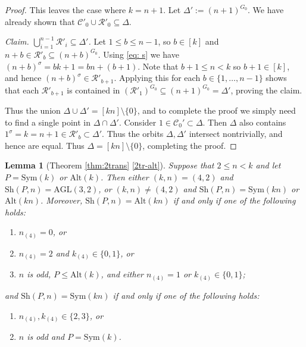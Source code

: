 \documentclass[12pt]{amsart}
\newtheorem{lem}[thm]{Lemma}
\theoremstyle{remark}
\theoremstyle{definition}
\newcounter{claim}[thm]
\newcommand{\sym}{\mathrm{Sym}}
\newcommand{\alt}{\mathrm{Alt}}
\newcommand{\sh}{\mathrm{Sh}}
\newcommand{\AGL}{\mathrm{AGL}}
\begin{document}
\begin{proof}
This leaves the case where $k = n+1$. Let $\Delta':=(n+1)^{G_0}$. We have already shown that $\mathcal{C}'_0 \cup \mathcal{R}'_0 \subseteq \Delta$. 

\medskip\noindent
\emph{Claim. $\bigcup_{i=1}^{n-1} \mathcal{R}'_i \subseteq \Delta'$.} Let $1 \leqslant b \leqslant n-1$, so $b \in [k]$ and $n+b \in \mathcal{R}'_b \subseteq (n+b)^{G_0}$. Using \eqref{eq: s} we have $(n+b)^\sigma = bk+1 = bn + (b+1)$. Note that $b+1 \leqslant n < k$ so $b+1 \in [k]$, and hence $(n+b)^\sigma \in \mathcal{R}'_{b+1}$. Applying this for each $b \in \{1, \ldots, n-1\}$ shows that each $\mathcal{R}'_{b+1}$ is contained in $(\mathcal{R}'_1)^{G_0} \subseteq (n+1)^{G_0}=\Delta'$, proving the claim. 

Thus the union $\Delta\cup \Delta'=[kn]\setminus\{0\}$, and to complete the proof we simply need to find a single point in $\Delta\cap \Delta'$. Consider $1\in \mathcal{C}_0'\subset \Delta$. Then $\Delta$ also contains  $1^\sigma = k = n+1 \in \mathcal{R}'_b \subset \Delta'$. Thus the orbits $\Delta, \Delta'$ intersect nontrivially, and hence are equal. Thus $\Delta = [kn] \setminus \{0\}$, completing the proof.
\end{proof}

\begin{lem}[Theorem \ref{thm:2trans} \eqref{2tr-alt}] \label{lem:2trans-full}
Suppose that $2 \leqslant n < k$ and let $P = \sym(k)$ or $\alt(k)$. Then either $(k,n) = (4,2)$ and $\sh(P,n) = \AGL(3,2)$, or $(k,n) \neq (4,2)$ and $\sh(P,n) = \sym(kn)$ or $\alt(kn)$.  Moreover, $\sh(P,n) = \alt(kn)$ if and only if one of the following holds:
	\begin{enumerate}
	\item $n_{(4)} = 0$, or
	\item $n_{(4)} = 2$ and $k_{(4)} \in \{0,1\}$, or
	\item $n$ is odd, $P \leqslant \alt(k)$, and either $n_{(4)} = 1$ or $k_{(4)} \in \{0,1\}$;
	\end{enumerate}
and $\sh(P,n) = \sym(kn)$ if and only if one of the following holds:
	\begin{enumerate}
	\item[(4)] $n_{(4)}, k_{(4)} \in \{2,3\}$, or
	\item[(5)] $n$ is odd and $P = \sym(k)$.
\end{enumerate}
\end{lem}
\end{document}
